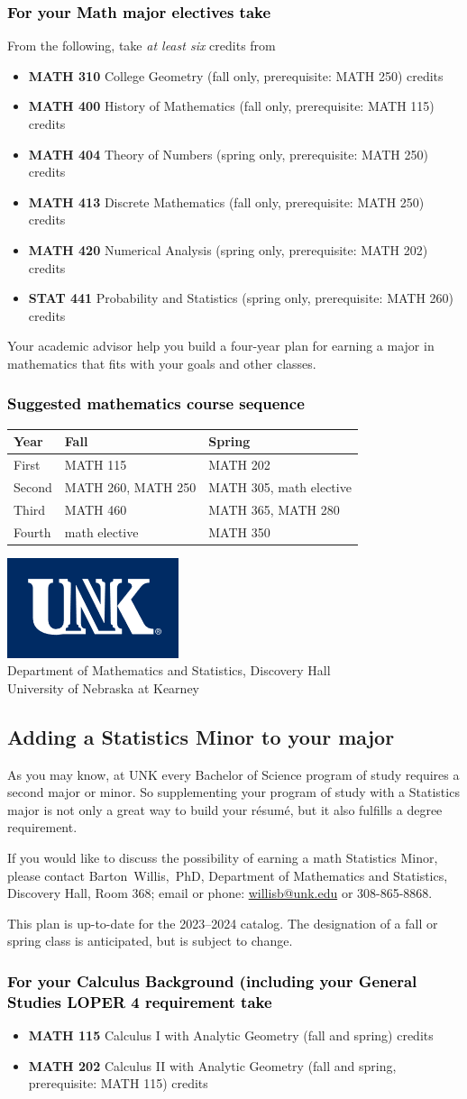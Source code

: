 \documentclass[11pt]{article}
\makeatletter
\newcommand{\calcone}{\textbf{MATH 115} Calculus I with Analytic Geometry (fall and spring) \dotfill 5 credits}
\newcommand{\calconeshort}{MATH 115}
\newcommand{\calctwo}{\textbf{MATH 202} Calculus II with Analytic Geometry (fall and spring, prerequisite: MATH 115) \dotfill 5 credits }
\newcommand{\calctwoshort}{MATH 202}
\newcommand{\foundationsshort}{MATH 250}
\newcommand{\calcthreeshort}{MATH 260}
\newcommand{\linearshort}{MATH 280}
\newcommand{\discrete}{\textbf{MATH 413} Discrete Mathematics  (fall only, prerequisite: MATH 250)\dotfill 3 credits}
\newcommand{\statistics}{\textbf{STAT 441} Probability and Statistics (spring only, prerequisite: MATH 260)  \dotfill  3 credits}
\newcommand{\diffeqshort}{MATH 305}
\newcommand{\abstractalgebrashort}{MATH 350}
\newcommand{\complexshort}{MATH 365}
\newcommand{\advancedcalcshort}{MATH 460}
\newcommand{\numerical}{\textbf{MATH 420}   Numerical Analysis   (spring only, prerequisite: MATH 202)\dotfill 3 credits}
\newcommand{\collegegeometry}{\textbf{MATH 310}	College Geometry (fall only,  prerequisite: MATH 250) \dotfill 3 credits}
\newcommand{\mathhistory}{\textbf{MATH 400} History of Mathematics (fall only,  prerequisite: MATH 115) \dotfill 3 credits}
\newcommand{\numbertheory}{\textbf{MATH 404} Theory of Numbers (spring only,  prerequisite: MATH 250) \dotfill 3 credits}
\newcommand{\contactbw}{\mbox{Barton Willis, PhD}, Department of Mathematics and Statistics,  Discovery Hall, Room 368;
email or phone: \href{mailto:willisb@unk.edu}{willisb@unk.edu} or 308-865-8868.}
\newcommand{\forinfo}[2]{If you would like to discuss the possibility of earning a math {#1}, please contact \contactbw}
\newcommand{\catalog}{2023--2024 }
\newcommand{\LOPER}{LOPER\xspace}
\newcommand{\uptodate}{This plan is up-to-date for  the \catalog catalog. The designation of a fall or spring class is 
anticipated, but  is subject to change.}
\newcommand{\myheading}{
\begin{flushleft}
\includegraphics[scale=0.35]{unk-logo}\\
\setcounter{footnote}{0}
\vspace{0.25in}
 \textcolor{unkblue}{Department of Mathematics and Statistics, Discovery Hall} \\
  \textcolor{unkblue}{University of Nebraska at Kearney}
\end{flushleft}}
\newcommand{\mathBS}{
     \begin{center}
         \begin{tabular}[h]{| l | l | l|} 
            \hline
            \textbf{Year}           & \textbf{Fall}         &  \textbf{Spring}  \\ \hline 
            First & \calconeshort{}  & \calctwoshort \\  \hline
            Second &  \calcthreeshort{}, \foundationsshort & \diffeqshort, math elective \\ \hline
            Third & \advancedcalcshort              &  \complexshort{}, \linearshort \\ \hline
            Fourth & math elective &  \abstractalgebrashort  \\ \hline
         \end{tabular}
\end{center}}
\makeatother
\begin{document}
\subsubsection*{\textcolor{black}{For your Math major electives take}}

From the following, take \emph{at least six} credits from
\vspace{0.1in}

\begin{itemize}
\item \collegegeometry
\item \mathhistory
\item \numbertheory
\item \discrete
\item \numerical
\item \statistics
\end{itemize}
\vspace{0.1in}
\noindent Your academic advisor help you build a four-year plan for earning a 
major in mathematics that fits with your goals and other classes.

\subsubsection*{\textcolor{black}{Suggested mathematics course sequence}}

\mathBS

\newpage 
\myheading
\subsection*{\textbf{\textcolor{unkblue}{Adding a Statistics Minor to your major}}}



As you may know, at UNK every Bachelor of Science program of study requires a second
major or minor. So supplementing your  program of study with a Statistics major is not only a great
way to build your r\'esum\'e, but it also fulfills a degree requirement.

\forinfo{Statistics Minor}{}

\uptodate

\vspace{-0.1in}

\subsubsection*{\textcolor{black}{For your Calculus Background (including your General Studies \LOPER 4 requirement take}}
\begin{itemize}
\item  \calcone
\item \calctwo
\end{itemize}
\end{document}
